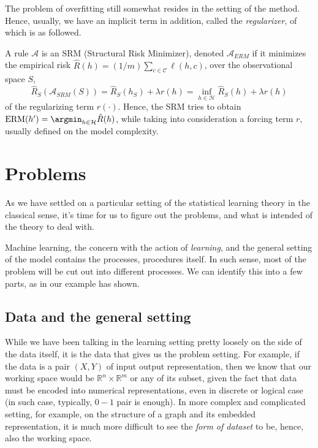 The problem of overfitting still somewhat resides in the setting of the method. Hence, usually, we have an implicit term in addition, called the \textit{regularizer}, of which is as followed. 

\begin{definition}
    A rule $\mathcal{A}$ is an SRM (Structural Risk Minimizer), denoted $\mathcal{A}_{ERM}$ if it minimizes the empirical risk $\hat{R}(h)=(1/m)\sum_{c\in\mathcal{C}}\ell(h,c)$, over the observational space $S$, 
    \begin{equation}
        \hat{R}_{S}(\mathcal{A}_{SRM}(S)) = \hat{R}_{S} (h_{S}) + \lambda r(h)= \inf_{h\in\mathcal{H}} \hat{R}_{S}(h) + \lambda r(h)
    \end{equation}
    of the regularizing term $r(\cdot)$. Hence, the SRM tries to obtain $\mathrm{ERM}(h') = \argmin_{h\in \mathcal{H}} \hat{R}(h)$, while taking into consideration a forcing term $r$, usually defined on the model complexity. 
\end{definition}

\section{Problems}\label{sec:LearningProblems}
As we have settled on a particular setting of the statistical learning theory in the classical sense, it's time for us to figure out the problems, and what is intended of the theory to deal with. 

Machine learning, the concern with the action of \textit{learning}, and the general setting of the model contains the processes, procedures itself. In such sense, most of the problem will be cut out into different processes. We can identify this into a few parts, as in our example has shown. 

\subsection{Data and the general setting}
While we have been talking in the learning setting pretty loosely on the side of the data itself, it is the data that gives us the problem setting. For example, if the data is a pair $(X,Y)$ of input output representation, then we know that our working space would be $\mathbb{R}^n \times \mathbb{R}^m$ or any of its subset, given the fact that data must be encoded into numerical representations, even in discrete or logical case (in such case, typically, $0-1$ pair is enough). In more complex and complicated setting, for example, on the structure of a graph and its embedded representation, it is much more difficult to see the \textit{form of dataset} to be, hence, also the working space. 

